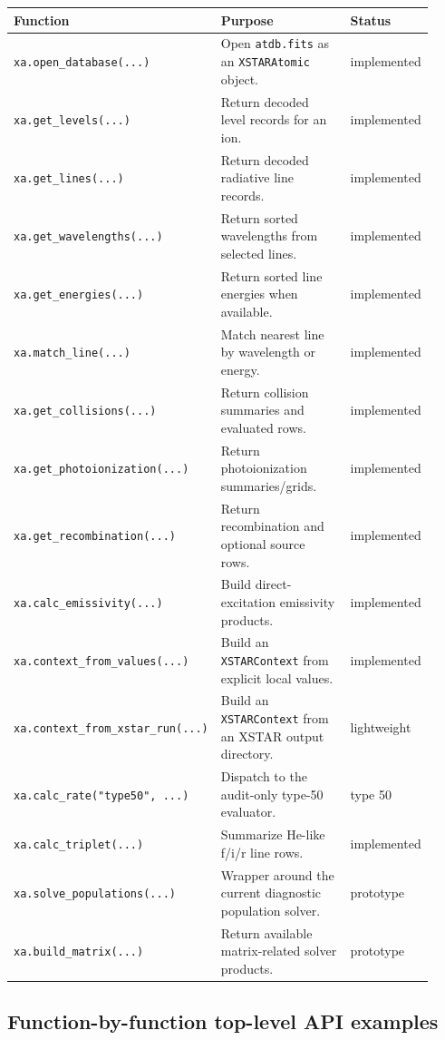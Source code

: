 \documentclass[11pt]{article}
\begin{document}
\begin{longtable}{p{0.35\linewidth}p{0.43\linewidth}p{0.14\linewidth}}
\toprule
Function & Purpose & Status \\
\midrule
\texttt{xa.open\_database(...)} & Open \texttt{atdb.fits} as an \texttt{XSTARAtomic} object. & implemented \\
\texttt{xa.get\_levels(...)} & Return decoded level records for an ion. & implemented \\
\texttt{xa.get\_lines(...)} & Return decoded radiative line records. & implemented \\
\texttt{xa.get\_wavelengths(...)} & Return sorted wavelengths from selected lines. & implemented \\
\texttt{xa.get\_energies(...)} & Return sorted line energies when available. & implemented \\
\texttt{xa.match\_line(...)} & Match nearest line by wavelength or energy. & implemented \\
\texttt{xa.get\_collisions(...)} & Return collision summaries and evaluated rows. & implemented \\
\texttt{xa.get\_photoionization(...)} & Return photoionization summaries/grids. & implemented \\
\texttt{xa.get\_recombination(...)} & Return recombination and optional source rows. & implemented \\
\texttt{xa.calc\_emissivity(...)} & Build direct-excitation emissivity products. & implemented \\
\texttt{xa.context\_from\_values(...)} & Build an \texttt{XSTARContext} from explicit local values. & implemented \\
\texttt{xa.context\_from\_xstar\_run(...)} & Build an \texttt{XSTARContext} from an XSTAR output directory. & lightweight \\
\texttt{xa.calc\_rate("type50", ...)} & Dispatch to the audit-only type-50 evaluator. & type 50 \\
\texttt{xa.calc\_triplet(...)} & Summarize He-like f/i/r line rows. & implemented \\
\texttt{xa.solve\_populations(...)} & Wrapper around the current diagnostic population solver. & prototype \\
\texttt{xa.build\_matrix(...)} & Return available matrix-related solver products. & prototype \\
\bottomrule
\end{longtable}


\subsection{Function-by-function top-level API examples}
\end{document}
